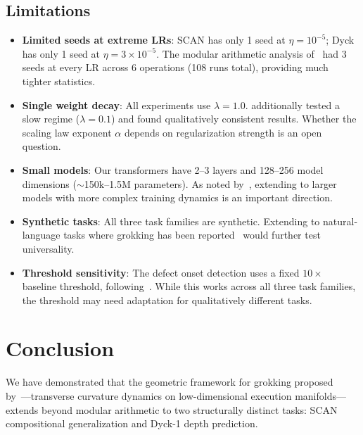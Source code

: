 \documentclass[11pt]{article}
\begin{document}
\subsection{Limitations}

\begin{itemize}
  \item \textbf{Limited seeds at extreme LRs}: SCAN has only 1 seed at $\eta = 10^{-5}$; Dyck has only 1 seed at $\eta = 3 \times 10^{-5}$. The modular arithmetic analysis of~\citet{xu2026integrability} had 3 seeds at every LR across 6 operations (108 runs total), providing much tighter statistics.

  \item \textbf{Single weight decay}: All experiments use $\lambda = 1.0$. \citet{xu2026integrability} additionally tested a slow regime ($\lambda = 0.1$) and found qualitatively consistent results. Whether the scaling law exponent $\alpha$ depends on regularization strength is an open question.

  \item \textbf{Small models}: Our transformers have 2--3 layers and 128--256 model dimensions ($\sim$150k--1.5M parameters). As noted by~\citet{xu2026integrability}, extending to larger models with more complex training dynamics is an important direction.

  \item \textbf{Synthetic tasks}: All three task families are synthetic. Extending to natural-language tasks where grokking has been reported~\citep{murty2023grokking} would further test universality.

  \item \textbf{Threshold sensitivity}: The defect onset detection uses a fixed $10\times$ baseline threshold, following~\citet{xu2026integrability}. While this works across all three task families, the threshold may need adaptation for qualitatively different tasks.
\end{itemize}


\section{Conclusion}
\label{sec:conclusion}

We have demonstrated that the geometric framework for grokking proposed by~\citet{xu2026integrability}---transverse curvature dynamics on low-dimensional execution manifolds---extends beyond modular arithmetic to two structurally distinct tasks: SCAN compositional generalization and Dyck-1 depth prediction.
\end{document}
